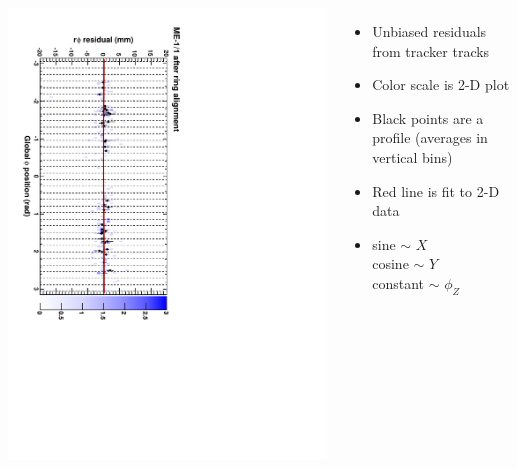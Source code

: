 \documentclass[compress]{beamer}
\begin{document}
\begin{frame}
\begin{columns}
\includegraphics[height=\linewidth, angle=90]{ringfits_after/mem11.pdf}
\begin{itemize}
\item Unbiased residuals from tracker tracks
\item Color scale is 2-D plot
\item Black points are a profile (averages in vertical bins)
\item Red line is fit to 2-D data
\item sine $\sim$ $X$ \\
cosine $\sim$ $Y$ \\
constant $\sim$ $\phi_Z$
\end{itemize}
\end{columns}
\end{frame}
\end{document}
